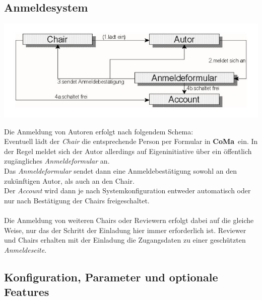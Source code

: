 \documentclass[headexclude,footexclude,12pt,BCOR0pt,DIV15]{scrartcl}
\newcommand{\CoMa}{\textbf{CoMa}}
\begin{document}
    \subsection{Anmeldesystem}
    \begin{center}\includegraphics[width=17cm]{anmelde1}\end{center}
    Die Anmeldung von Autoren erfolgt nach folgendem Schema:\\
    Eventuell l\"{a}dt der \emph{Chair} die entsprechende Person per Formular in \CoMa\ ein. In der Regel
    meldet sich der Autor allerdings auf Eigeninitiative \"{u}ber ein \"{o}ffentlich zug\"{a}ngliches \emph{Anmeldeformular} an.
    \\
    Das \emph{Anmeldeformular} sendet dann eine Anmeldebest\"{a}tigung sowohl an den zuk\"{u}nftigen Autor, als auch
    an den Chair.\\
    Der \emph{Account} wird dann je nach Systemkonfiguration entweder automatisch oder nur nach Best\"{a}tigung der Chairs
    freigeschaltet.\\
    \\
    Die Anmeldung von weiteren Chairs oder Reviewern erfolgt dabei auf die gleiche Weise, nur das der Schritt der Einladung
    hier immer erforderlich ist. Reviewer und Chairs erhalten mit der Einladung die Zugangsdaten zu einer gesch\"{u}tzten
    \emph{Anmeldeseite}. \\

    \subsection{Konfiguration, Parameter und optionale Features} \label{Konfiguration}
\end{document}
